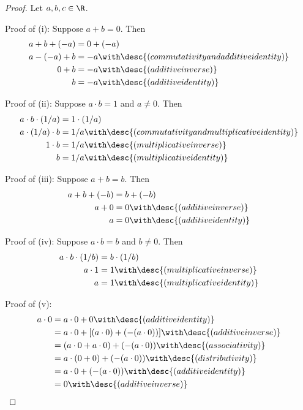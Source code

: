\begin{proof}
  Let $a,b,c\in\R$.

  Proof of (i): Suppose $a+b=0$. Then
  \begin{align*}
    a+b+(-a) &=0+(-a)                                              \\
    a-(-a)+b &=-a\with\desc{(commutativity and additive identity)} \\
    0+b      &=-a\with\desc{(additive inverse)}                    \\
    b        &=-a\with\desc{(additive identity)}
  \end{align*}

  Proof of (ii): Suppose $a\cdot b=1$ and $a\neq0$. Then
  \begin{align*}
    a\cdot b\cdot(1/a) &=1\cdot(1/a)                                                \\
    a\cdot(1/a)\cdot b &=1/a\with\desc{(commutativity and multiplicative identity)} \\
    1\cdot b           &=1/a\with\desc{(multiplicative inverse)}                    \\
    b                  &=1/a\with\desc{(multiplicative identity)}
  \end{align*}

  Proof of (iii): Suppose $a+b=b$. Then
  \begin{align*}
    a+b+(-b) &=b+(-b)                           \\
    a+0      &=0\with\desc{(additive inverse)}  \\
    a        &=0\with\desc{(additive identity)}
  \end{align*}

  Proof of (iv): Suppose $a\cdot b=b$ and $b\neq0$. Then
  \begin{align*}
    a\cdot b\cdot(1/b) &=b\cdot(1/b)                            \\
    a\cdot1            &=1\with\desc{(multiplicative inverse)}  \\
    a                  &=1\with\desc{(multiplicative identity)}
  \end{align*}

  Proof of (v):
  \begin{align*}
    a\cdot0 &= a\cdot0+0\with\desc{(additive identity)}                       \\
            &= a\cdot0+[(a\cdot0)+(-(a\cdot0))]\with\desc{(additive inverse)} \\
            &= (a\cdot0+a\cdot0)+(-(a\cdot0))\with\desc{(associativity)}      \\
            &= a\cdot(0+0)+(-(a\cdot0))\with\desc{(distributivity)}           \\
            &= a\cdot0+(-(a\cdot0))\with\desc{(additive identity)}            \\
            &= 0\with\desc{(additive inverse)}                                \\
  \end{align*}


\end{proof}

